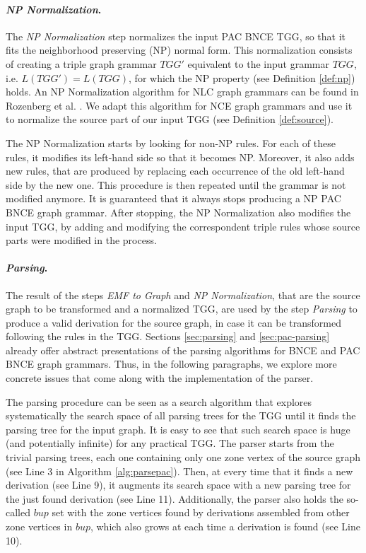 \paragraph*{\emph{NP Normalization}.} The \emph{NP Normalization} step normalizes the input PAC BNCE TGG, so that it fits the neighborhood preserving (NP) normal form. This normalization consists of creating a triple graph grammar $TGG'$ equivalent to the input grammar $TGG$, i.e. $L(TGG') = L(TGG)$, for which the NP property (see Definition \ref{def:np}) holds. An NP Normalization algorithm for NLC graph grammars can be found in Rozenberg et al. \cite{rozenberg1986boundary}. We adapt this algorithm for NCE graph grammars and use it to normalize the source part of our input TGG (see Definition \ref{def:source}).

The NP Normalization starts by looking for non-NP rules. For each of these rules, it modifies its left-hand side so that it becomes NP. Moreover, it also adds new rules, that are produced by replacing each occurrence of the old left-hand side by the new one. This procedure is then repeated until the grammar is not modified anymore. It is guaranteed that it always stops producing a NP PAC BNCE graph grammar. After stopping, the NP Normalization also modifies the input TGG, by adding and modifying the correspondent triple rules whose source parts were modified in the process.

\paragraph*{\emph{Parsing}.} The result of the steps \emph{EMF to Graph} and \emph{NP Normalization}, that are the source graph to be transformed and a normalized TGG, are used by the step \emph{Parsing} to produce a valid derivation for the source graph, in case it can be transformed following the rules in the TGG. Sections \ref{sec:parsing} and \ref{sec:pac-parsing} already offer abstract presentations of the parsing algorithms for BNCE and PAC BNCE graph grammars. Thus, in the following paragraphs, we explore more concrete issues that come along with the implementation of the parser.

The parsing procedure can be seen as a search algorithm that explores systematically the search space of all parsing trees for the TGG until it finds the parsing tree for the input graph. It is easy to see that such search space is huge (and potentially infinite) for any practical TGG. The parser starts from the trivial parsing trees, each one containing only one zone vertex of the source graph (see Line 3 in Algorithm \ref{alg:parsepac}). Then, at every time that it finds a new derivation (see Line 9), it augments its search space with a new parsing tree for the just found derivation (see Line 11). Additionally, the parser also holds the so-called $bup$ set with the zone vertices found by derivations assembled from other zone vertices in $bup$, which also grows at each time a derivation is found (see Line 10).

